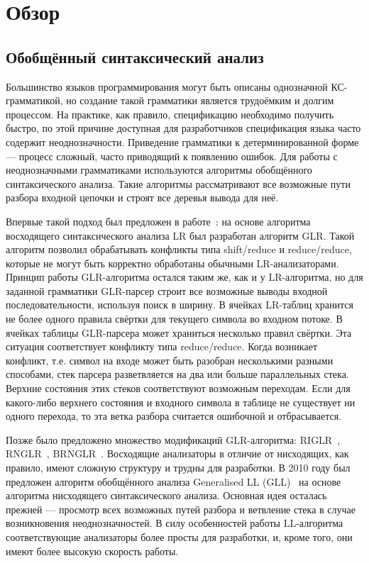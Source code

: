\section{Обзор}
\subsection{Обобщённый синтаксический анализ}
Большинство языков программирования могут быть описаны однозначной КС-грамматикой, но создание такой грамматики является трудоёмким и долгим процессом. На практике, как правило, спецификацию необходимо получить быстро, по этой причине доступная для разработчиков спецификация языка часто содержит неоднозначности. Приведение грамматики к детерминированной форме --- процесс сложный, часто приводящий к появлению ошибок. Для работы с неоднозначными грамматиками используются алгоритмы обобщённого синтаксического анализа. Такие алгоритмы рассматривают все возможные пути разбора входной цепочки и строят все деревья вывода для неё.

Впервые такой подход был предложен в работе~\cite{Tomita}: на основе алгоритма восходящего синтаксического анализа LR был разработан алгоритм GLR. Такой алгоритм позволил обрабатывать конфликты типа shift/reduce и reduce/reduce, которые не могут быть корректно обработаны обычными LR-анализаторами. Принцип работы GLR-алгоритма остался таким же, как и у LR-алгоритма, но для заданной грамматики GLR-парсер строит все возможные выводы входной последовательности, используя поиск в ширину. В ячейках LR-таблиц хранится не более одного правила свёртки для текущего символа во входном потоке. В ячейках таблицы GLR-парсера может храниться несколько правил свёртки. Эта ситуация соответствует конфликту типа reduce/reduce. Когда возникает конфликт, т.е. символ на входе может быть разобран несколькими разными способами, стек парсера разветвляется на два или больше параллельных стека. Верхние состояния этих стеков соответствуют возможным переходам. Если для какого-либо верхнего состояния и входного символа в таблице не существует ни одного перехода, то эта ветка разбора считается ошибочной и отбрасывается. 

Позже было предложено множество модификаций GLR-алгоритма: RIGLR~\cite{RIGLR}, RNGLR~\cite{RNGLR}, BRNGLR~\cite{BRNGLR}. Восходящие анализаторы в отличие от нисходящих, как правило, имеют сложную структуру и трудны для разработки. В 2010 году был предложен алгоритм обобщённого анализа Generalised LL (GLL)~\cite{GLL} на основе алгоритма нисходящего синтаксического анализа. Основная идея осталась прежней --- просмотр всех возможных путей разбора и ветвление стека в случае возникновения неоднозначностей. В силу особенностей работы LL-алгоритма соответствующие анализаторы более просты для разработки, и, кроме того, они имеют более высокую скорость работы.

